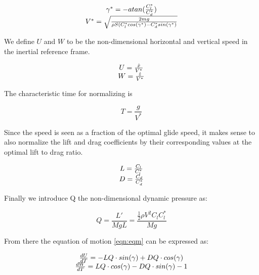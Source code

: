 \begin{equation}
\begin{array}[c]{c}
  \gamma^*= - atan(\frac{C_l^*}{C_d^*}) \\
  V^* = \sqrt{\frac{2mg}{\rho S (C_l^* cos(\gamma^*) - C_d^* sin(\gamma^*)}}
\end{array}
\label{eqn:glide_speed}
\end{equation}

\par We define $U$ and $W$ to be the non-dimensional horizontal and vertical speed in the inertial reference frame.

\begin{equation}
\begin{array}[c]{c}
  U = \frac{\dot{x}}{V^*} \\
  W= \frac{\dot{z}}{V^*}
\end{array}
\label{eqn:non_dim_speed}
\end{equation}

The characteristic time for normalizing is

\begin{equation}
  T = \frac{g}{V^*}
  \label{eqn:T}
\end{equation}

\par Since the speed is seen as a fraction of the optimal glide speed, it makes sense to also normalize the lift and drag coefficients by their corresponding values at the optimal lift to drag ratio.

\begin{equation}
\begin{array}[c]{c}
  L= \frac{C_l}{C_l^*} \\
  D= \frac{C_d}{C_d^*} 
\end{array}
\label{eqn:non_dim_coef}
\end{equation}

\par Finally we introduce Q the non-dimensional dynamic pressure as:

\begin{equation}
Q = \frac{L'}{MgL} = \frac{\frac{1}{2} \rho V^2 C_l C_l^* }{Mg}
\label{eqn:dynamic_pressure}
\end{equation}

\par From there the equation of motion \ref{eqn:eqm} can be expressed as:

\begin{equation}
\begin{array}[c]{c}
  \frac{dU}{dT}= -LQ \cdot sin(\gamma) + DQ \cdot cos(\gamma) \\ 
  \frac{dW}{dT}= LQ \cdot cos(\gamma) - DQ \cdot sin(\gamma) - 1
\end{array}
\label{eqn:non_dim_eqm}
\end{equation}

